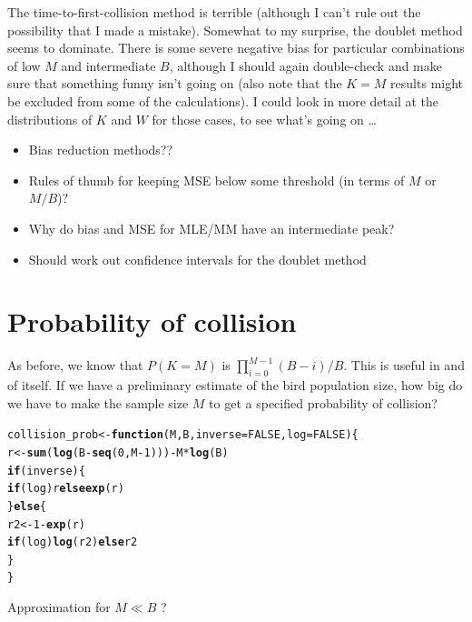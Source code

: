 \documentclass{article}\usepackage[]{graphicx}\usepackage[]{color}
\makeatletter
\newcommand{\hlnum}[1]{\textcolor[rgb]{0.686,0.059,0.569}{#1}}%
\newcommand{\hlopt}[1]{\textcolor[rgb]{0,0,0}{#1}}%
\newcommand{\hlstd}[1]{\textcolor[rgb]{0.345,0.345,0.345}{#1}}%
\newcommand{\hlkwa}[1]{\textcolor[rgb]{0.161,0.373,0.58}{\textbf{#1}}}%
\newcommand{\hlkwb}[1]{\textcolor[rgb]{0.69,0.353,0.396}{#1}}%
\newcommand{\hlkwc}[1]{\textcolor[rgb]{0.333,0.667,0.333}{#1}}%
\newcommand{\hlkwd}[1]{\textcolor[rgb]{0.737,0.353,0.396}{\textbf{#1}}}%
\newenvironment{kframe}{%
 \def\at@end@of@kframe{}%
 \ifinner\ifhmode%
  \def\at@end@of@kframe{\end{minipage}}%
  \begin{minipage}{\columnwidth}%
 \fi\fi%
 \def\FrameCommand##1{\hskip\@totalleftmargin \hskip-\fboxsep
 \colorbox{shadecolor}{##1}\hskip-\fboxsep
     \hskip-\linewidth \hskip-\@totalleftmargin \hskip\columnwidth}%
 \MakeFramed {\advance\hsize-\width
   \@totalleftmargin\z@ \linewidth\hsize
   \@setminipage}}%
 {\par\unskip\endMakeFramed%
 \at@end@of@kframe}
\newenvironment{knitrout}{}{} %
\makeatother
\begin{document}
The time-to-first-collision method is terrible (although I can't rule
out the possibility that I made a mistake).  Somewhat to my surprise,
the doublet method seems to dominate.  There is some severe negative
bias for particular combinations of low $M$ and intermediate $B$,
although I should again double-check and make sure that something
funny isn't going on (also note that the $K=M$ results might be
excluded from some of the calculations).  I could look in more detail
at the distributions of $K$ and $W$ for those cases, to see what's
going on \ldots 
\begin{itemize}
  \item Bias reduction methods??  
  \item Rules of thumb for keeping MSE below some threshold (in terms
    of $M$ or $M/B$)?
  \item Why do bias and MSE for MLE/MM have an intermediate peak?
  \item Should work out confidence intervals for the doublet method
\end{itemize}



\section{Probability of collision}
As before, we know that $P(K=M)$ is $\prod_{i=0}^{M-1} (B-i)/B$.
This is useful in and of itself.  If we have a preliminary
estimate of the bird population size, 
how big do we have to make the sample
size $M$ to get a specified probability of collision?
\begin{knitrout}
\color{fgcolor}\begin{kframe}
\begin{alltt}
\hlstd{collision_prob} \hlkwb{<-} \hlkwa{function}\hlstd{(}\hlkwc{M}\hlstd{,}\hlkwc{B}\hlstd{,}\hlkwc{inverse}\hlstd{=}\hlnum{FALSE}\hlstd{,}\hlkwc{log}\hlstd{=}\hlnum{FALSE}\hlstd{) \{}
    \hlstd{r} \hlkwb{<-} \hlkwd{sum}\hlstd{(}\hlkwd{log}\hlstd{(B}\hlopt{-}\hlkwd{seq}\hlstd{(}\hlnum{0}\hlstd{,M}\hlopt{-}\hlnum{1}\hlstd{)))}\hlopt{-}\hlstd{M}\hlopt{*}\hlkwd{log}\hlstd{(B)}
    \hlkwa{if} \hlstd{(inverse) \{}
        \hlkwa{if} \hlstd{(log) r} \hlkwa{else} \hlkwd{exp}\hlstd{(r)}
    \hlstd{\}} \hlkwa{else} \hlstd{\{}
        \hlstd{r2} \hlkwb{<-} \hlnum{1}\hlopt{-}\hlkwd{exp}\hlstd{(r)}
        \hlkwa{if} \hlstd{(log)} \hlkwd{log}\hlstd{(r2)} \hlkwa{else} \hlstd{r2}
    \hlstd{\}}
\hlstd{\}}
\end{alltt}
\end{kframe}
\end{knitrout}
Approximation for $M \ll B$ ?
\end{document}
